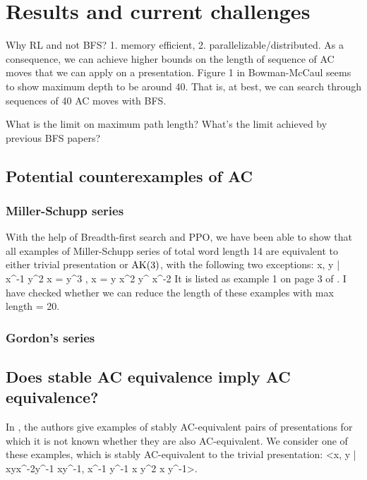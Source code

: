 
\section{Results and current challenges}

Why RL and not BFS? 1. memory efficient, 2. parallelizable/distributed.
As a consequence,  we can achieve higher bounds on the length of sequence of AC moves that we can apply on a presentation.
Figure 1 in Bowman-McCaul seems to show maximum depth to be around 40.
That is, at best, we can search through sequences of 40 AC moves with BFS.

What is the limit on maximum path length? What's the limit achieved by previous BFS papers?

\subsection{Potential counterexamples of AC}

\subsubsection{Miller-Schupp series}

With the help of Breadth-first search and PPO, we have been able to show that all examples of Miller-Schupp series of total word length 14 are equivalent to either trivial presentation or $\text{AK}(3)$, with the following two exceptions:
\bea
\langle x, y | x^{-1} y^2 x = y^{3} , x = y x^2 y^{} x^{-2}\rangle
\eea
It is listed as example 1 on page 3 of \cite{MMS}.
I have checked whether we can reduce the length of these examples with max length = 20.


\subsubsection{Gordon's series}


\subsection{Does stable AC equivalence imply AC equivalence?}

In \cite{MMS}, the authors give examples of stably AC-equivalent pairs of presentations for which it is not known whether they are also AC-equivalent.
We consider one of these examples, which is stably AC-equivalent to the trivial presentation:
\bea
<x, y | xyx^{-2}y^{-1} xy^{-1}, x^{-1} y^{-1} x y^2 x y^{-1}>.
\eea

